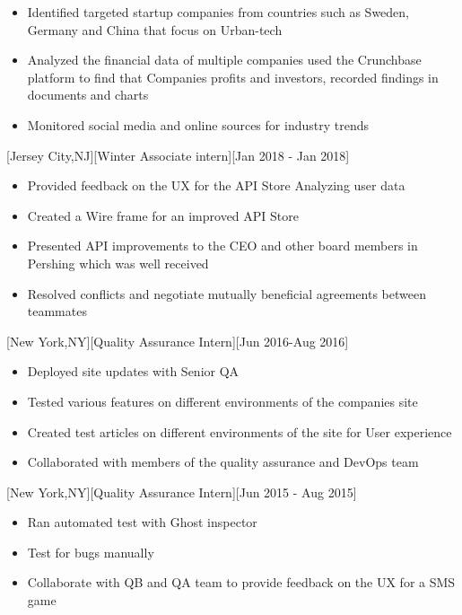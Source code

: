\documentclass{article}
\begin{document}
\begin{itemize}
\item Identified targeted startup companies from countries such as Sweden, Germany and China that focus on Urban-tech
\item Analyzed the financial data of multiple companies used the Crunchbase platform to find that Companies profits and investors, recorded findings in documents and charts 
\item Monitored social media and online sources for industry trends

\end{itemize}
[Jersey City,NJ][Winter Associate intern][Jan 2018 - Jan 2018]
\begin{itemize}
\item Provided feedback on the UX for the API Store Analyzing user data
\item Created a Wire frame for an improved API Store
\item Presented API improvements to the CEO and other board members in Pershing which was well received 
\item Resolved conflicts and negotiate mutually beneficial agreements between teammates 
\end{itemize}
[New York,NY][Quality Assurance Intern][Jun 2016-Aug 2016]
\begin{itemize}
\item Deployed site updates with Senior QA
\item Tested various features on different environments of the companies site
\item Created test articles on different environments of the site for User experience
\item Collaborated with members of the quality assurance and DevOps team
\end{itemize}
[New York,NY][Quality Assurance Intern][Jun 2015 - Aug 2015]
\begin{itemize}
\item Ran automated test with Ghost inspector
\item Test for bugs manually
\item Collaborate with QB and QA team to provide feedback on the UX for a SMS game
\end{itemize}
\end{document}
